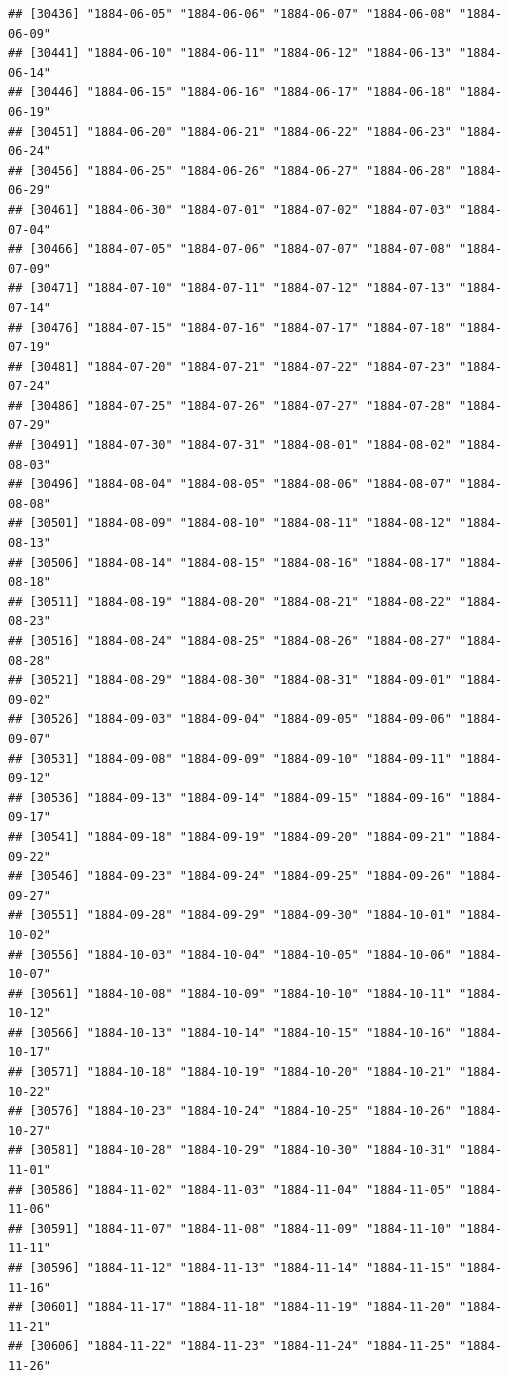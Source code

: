 \documentclass{article}\usepackage[]{graphicx}\usepackage[]{color}
\makeatletter
\newenvironment{kframe}{%
 \def\at@end@of@kframe{}%
 \ifinner\ifhmode%
  \def\at@end@of@kframe{\end{minipage}}%
  \begin{minipage}{\columnwidth}%
 \fi\fi%
 \def\FrameCommand##1{\hskip\@totalleftmargin \hskip-\fboxsep
 \colorbox{shadecolor}{##1}\hskip-\fboxsep
     \hskip-\linewidth \hskip-\@totalleftmargin \hskip\columnwidth}%
 \MakeFramed {\advance\hsize-\width
   \@totalleftmargin\z@ \linewidth\hsize
   \@setminipage}}%
 {\par\unskip\endMakeFramed%
 \at@end@of@kframe}
\newenvironment{knitrout}{}{} %
\makeatother
\begin{document}
\begin{description}
\begin{knitrout}
\begin{kframe}
\begin{verbatim}
## [30436] "1884-06-05" "1884-06-06" "1884-06-07" "1884-06-08" "1884-06-09"
## [30441] "1884-06-10" "1884-06-11" "1884-06-12" "1884-06-13" "1884-06-14"
## [30446] "1884-06-15" "1884-06-16" "1884-06-17" "1884-06-18" "1884-06-19"
## [30451] "1884-06-20" "1884-06-21" "1884-06-22" "1884-06-23" "1884-06-24"
## [30456] "1884-06-25" "1884-06-26" "1884-06-27" "1884-06-28" "1884-06-29"
## [30461] "1884-06-30" "1884-07-01" "1884-07-02" "1884-07-03" "1884-07-04"
## [30466] "1884-07-05" "1884-07-06" "1884-07-07" "1884-07-08" "1884-07-09"
## [30471] "1884-07-10" "1884-07-11" "1884-07-12" "1884-07-13" "1884-07-14"
## [30476] "1884-07-15" "1884-07-16" "1884-07-17" "1884-07-18" "1884-07-19"
## [30481] "1884-07-20" "1884-07-21" "1884-07-22" "1884-07-23" "1884-07-24"
## [30486] "1884-07-25" "1884-07-26" "1884-07-27" "1884-07-28" "1884-07-29"
## [30491] "1884-07-30" "1884-07-31" "1884-08-01" "1884-08-02" "1884-08-03"
## [30496] "1884-08-04" "1884-08-05" "1884-08-06" "1884-08-07" "1884-08-08"
## [30501] "1884-08-09" "1884-08-10" "1884-08-11" "1884-08-12" "1884-08-13"
## [30506] "1884-08-14" "1884-08-15" "1884-08-16" "1884-08-17" "1884-08-18"
## [30511] "1884-08-19" "1884-08-20" "1884-08-21" "1884-08-22" "1884-08-23"
## [30516] "1884-08-24" "1884-08-25" "1884-08-26" "1884-08-27" "1884-08-28"
## [30521] "1884-08-29" "1884-08-30" "1884-08-31" "1884-09-01" "1884-09-02"
## [30526] "1884-09-03" "1884-09-04" "1884-09-05" "1884-09-06" "1884-09-07"
## [30531] "1884-09-08" "1884-09-09" "1884-09-10" "1884-09-11" "1884-09-12"
## [30536] "1884-09-13" "1884-09-14" "1884-09-15" "1884-09-16" "1884-09-17"
## [30541] "1884-09-18" "1884-09-19" "1884-09-20" "1884-09-21" "1884-09-22"
## [30546] "1884-09-23" "1884-09-24" "1884-09-25" "1884-09-26" "1884-09-27"
## [30551] "1884-09-28" "1884-09-29" "1884-09-30" "1884-10-01" "1884-10-02"
## [30556] "1884-10-03" "1884-10-04" "1884-10-05" "1884-10-06" "1884-10-07"
## [30561] "1884-10-08" "1884-10-09" "1884-10-10" "1884-10-11" "1884-10-12"
## [30566] "1884-10-13" "1884-10-14" "1884-10-15" "1884-10-16" "1884-10-17"
## [30571] "1884-10-18" "1884-10-19" "1884-10-20" "1884-10-21" "1884-10-22"
## [30576] "1884-10-23" "1884-10-24" "1884-10-25" "1884-10-26" "1884-10-27"
## [30581] "1884-10-28" "1884-10-29" "1884-10-30" "1884-10-31" "1884-11-01"
## [30586] "1884-11-02" "1884-11-03" "1884-11-04" "1884-11-05" "1884-11-06"
## [30591] "1884-11-07" "1884-11-08" "1884-11-09" "1884-11-10" "1884-11-11"
## [30596] "1884-11-12" "1884-11-13" "1884-11-14" "1884-11-15" "1884-11-16"
## [30601] "1884-11-17" "1884-11-18" "1884-11-19" "1884-11-20" "1884-11-21"
## [30606] "1884-11-22" "1884-11-23" "1884-11-24" "1884-11-25" "1884-11-26"

\end{verbatim}
\end{kframe}
\end{knitrout}
\end{description}
\end{document}
